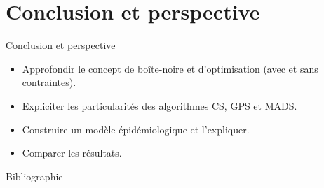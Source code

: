\documentclass{beamer}
\begin{document}
\section{Conclusion et perspective}
\begin{frame}{Conclusion et perspective}

    \begin{itemize}
        \item Approfondir le concept de boîte-noire et d'optimisation (avec et sans contraintes).
        \item Expliciter les particularités des algorithmes CS, GPS et MADS.
        \item Construire un modèle épidémiologique et l'expliquer.
        \item Comparer les résultats.
        
    \end{itemize}
    
\end{frame}

\begin{frame}{Bibliographie}
    
    
    
\end{frame}
\end{document}
